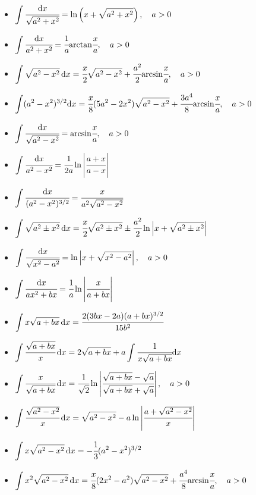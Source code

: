 \begin{itemize}
\item $ \displaystyle \int \cfrac{{ { \text{d} } x}}{\sqrt{a^2 + x^2}}= \ln \left(x + \sqrt{a^2 + x^2}\right),\quad a > 0 $
\item $ \displaystyle \int \cfrac{{ { \text{d} } x}}{a^2 + x^2}= \cfrac{1}{a} { \mathop{\text{arctan}} } \cfrac{x}{a} ,\quad a > 0 $
\item $ \displaystyle \int \sqrt{a^2 - x^2} \, { { \text{d} } x} = \cfrac{x}{2} \sqrt{a^2 - x^2} + \cfrac{a^2}{2} { \mathop{\text{arcsin}} } \cfrac{x}{a} ,\quad a > 0 $
\item $ \displaystyle \int (a^2 - x^2)^{3/2} { { \text{d} } x} = \cfrac{x}{8} (5a^2 - 2x^2)\sqrt{a^2 - x^2} + \cfrac{3a^4}{8} { \mathop{\text{arcsin}} } \cfrac{x}{a} ,\quad a > 0 $
\item $ \displaystyle \int \cfrac{{ { \text{d} } x}}{\sqrt{a^2 - x^2}} = { \mathop{\text{arcsin}} } \cfrac{x}{a} ,\quad a > 0 $
\item $ \displaystyle \int \cfrac{{ { \text{d} } x}}{a^2 - x^2} = \cfrac{1}{2a} \ln\left\vert \cfrac{a + x}{a - x}\right\vert $
\item $ \displaystyle \int \cfrac{{ { \text{d} } x}}{(a^2 - x^2)^{3/2}} = \cfrac{x}{a^2\sqrt{a^2 - x^2}} $
\item $ \displaystyle \int \sqrt{a^2 \pm x^2} \, { { \text{d} } x} = \cfrac{x}{2} \sqrt{a^2 \pm x^2} \pm \cfrac{a^2}{2} \ln\left\vert x + \sqrt{a^2 \pm x^2}\right\vert $
\item $ \displaystyle \int \cfrac{{ { \text{d} } x}}{\sqrt{x^2 - a^2}}= \ln\left\vert x + \sqrt{x^2 - a^2}\right\vert, \quad a > 0 $
\item $ \displaystyle \int \cfrac{{ { \text{d} } x}}{a x^2 + b x}= \cfrac{1}{a} \ln\left\vert\cfrac{x}{a + bx}\right\vert $
\item $ \displaystyle \int x \sqrt{a + b x} \, { { \text{d} } x}= \cfrac{2(3bx - 2a)(a + bx)^{3/2}}{15 b^2} $
\item $ \displaystyle \int \cfrac{\sqrt{a + b x}}{x} \, { { \text{d} } x}= 2\sqrt{a + b x} + a \int \cfrac{1}{x \sqrt{a + b x}} { { \text{d} } x} $
\item $ \displaystyle \int \cfrac{x}{\sqrt{a + b x}} \, { { \text{d} } x}= \cfrac{1}{\sqrt{2}} \ln\left\vert\cfrac{\sqrt{a + b x} - \sqrt{a}}{\sqrt{a + b x} + \sqrt{a}}\right\vert, \quad a > 0 $
\item $ \displaystyle \int \cfrac{\sqrt{a^2 - x^2}}{x} \, { { \text{d} } x} = \sqrt{a^2 - x^2} - a \ln\left\vert\cfrac{a + \sqrt{a^2 - x^2}}{x}\right\vert $
\item $ \displaystyle \int x \sqrt{a^2 - x^2} \, { { \text{d} } x} = - \cfrac{1}{3} (a^2 - x^2)^{3/2} $
\item $ \displaystyle \int x^2 \sqrt{a^2 - x^2} \, { { \text{d} } x} = \cfrac{x}{8} (2x^2 - a^2)\sqrt{a^2 - x^2} + \cfrac{a^4}{8} { \mathop{\text{arcsin}} } \cfrac{x}{a} , \quad a > 0 $

\end{itemize}
